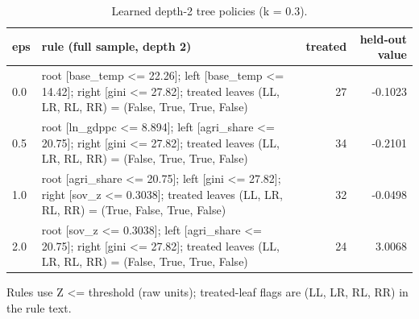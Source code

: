 \begin{table}[htbp]
\centering
\caption{Learned depth-2 tree policies (k = 0.3).}
\label{tab:trees}
\begin{tabular}{lp{8cm}rr}
\toprule
eps & rule (full sample, depth 2) & treated & held-out value \\
\midrule
0.0 & root [base\_temp <= 22.26]; left [base\_temp <= 14.42]; right [gini <= 27.82]; treated leaves (LL, LR, RL, RR) = (False, True, True, False) & 27 & -0.1023 \\
0.5 & root [ln\_gdppc <= 8.894]; left [agri\_share <= 20.75]; right [gini <= 27.82]; treated leaves (LL, LR, RL, RR) = (False, True, True, False) & 34 & -0.2101 \\
1.0 & root [agri\_share <= 20.75]; left [gini <= 27.82]; right [sov\_z <= 0.3038]; treated leaves (LL, LR, RL, RR) = (True, False, True, False) & 32 & -0.0498 \\
2.0 & root [sov\_z <= 0.3038]; left [agri\_share <= 20.75]; right [gini <= 27.82]; treated leaves (LL, LR, RL, RR) = (False, True, True, False) & 24 & 3.0068 \\
\bottomrule
\end{tabular}
\par\smallskip\footnotesize Rules use Z <= threshold (raw units); treated-leaf flags are (LL, LR, RL, RR) in the rule text.
\end{table}
